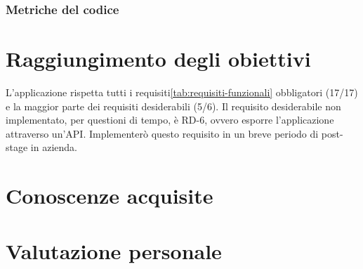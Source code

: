 \subsubsection{Metriche del codice}

\section{Raggiungimento degli obiettivi}
L'applicazione rispetta tutti i requisiti\ref{tab:requisiti-funzionali} obbligatori (17/17) e la maggior parte dei requisiti desiderabili (5/6). Il requisito desiderabile non implementato, per questioni di tempo, è RD-6, ovvero esporre l'applicazione attraverso un'API. Implementerò questo requisito in un breve periodo di post-stage in azienda.
\section{Conoscenze acquisite}

\section{Valutazione personale}
